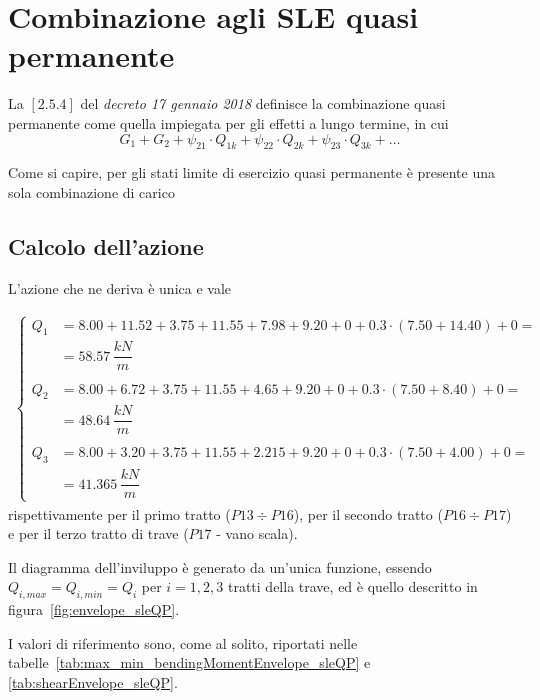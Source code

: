 \section{Combinazione agli SLE quasi permanente}
La $[2.5.4]$ del \emph{decreto 17 gennaio 2018} definisce la combinazione quasi permanente come quella impiegata per gli effetti a lungo termine, in cui
\[
	G_1 + G_2 + \psi_{21}\cdot Q_{1k} + \psi_{22}\cdot Q_{2k} + \psi_{23}\cdot Q_{3k} + \dots
\]

Come si capire, per gli stati limite di esercizio quasi permanente è presente una sola combinazione di carico

\subsection{Calcolo dell'azione}
L'azione che ne deriva è unica e vale

\begin{align*}
	\begin{cases}
		 Q_{1} &= 8.00+11.52+3.75 + 11.55+7.98+9.20 + 0 + 0.3\cdot(7.50+14.40) + 0 =\\&= 58.57\,\dfrac{kN}{m}\\\\
		 Q_2 &= 8.00+6.72+3.75 + 11.55+4.65+9.20 + 0+ 0.3\cdot(7.50+8.40) + 0 =\\&= 48.64\,\dfrac{kN}{m}\\\\
		 Q_3 &=  8.00+3.20+3.75 + 11.55+2.215+9.20 + 0+ 0.3\cdot(7.50+4.00) + 0 =\\&= 41.365\,\dfrac{kN}{m}
	\end{cases}
\end{align*}
rispettivamente per il primo tratto ($P13\div P16$), per il secondo tratto ($P16\div P17$) e per il terzo tratto di trave ($P17$ - vano scala).

Il diagramma dell'inviluppo è generato da un'unica funzione, essendo $Q_{i,max} = Q_{i,min} = Q_i$ per $i=1,2,3$ tratti della trave, ed è quello descritto in figura~\ref{fig:envelope_sleQP}.

I valori di riferimento sono, come al solito, riportati nelle tabelle~\ref{tab:max_min_bendingMomentEnvelope_sleQP} e \ref{tab:shearEnvelope_sleQP}.

